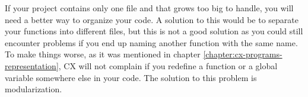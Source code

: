 \documentclass[11pt,fleqn,openany]{book} %
\begin{document}

If your project contains only one file and that grows too big to handle, you will need a better way to organize your code. A solution to this would be to separate your functions into different files, but this is not a good solution as you could still encounter problems if you end up naming another function with the same name. To make things worse, as it was mentioned in chapter \ref{chapter:cx-programs-representation}, CX will not complain if you redefine a function or a global variable somewhere else in your code. The solution to this problem is modularization.
\end{document}
